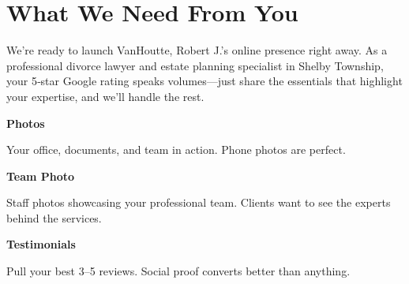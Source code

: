 \documentclass[11pt,letterpaper]{article}
\begin{document}
\vspace{0.2em}

\section*{What We Need From You}

We’re ready to launch VanHoutte, Robert J.’s online presence right away. As a professional divorce lawyer and estate planning specialist in Shelby Township, your 5‑star Google rating speaks volumes—just share the essentials that highlight your expertise, and we’ll handle the rest.

\vspace{0.12em}

\noindent\begin{minipage}[t]{0.48\textwidth}
\begin{tcolorbox}[colframe=accent-teal, boxrule=1pt, left=0.7em, right=0.7em, top=0.5em, bottom=0.5em, arc=4pt, boxsep=0pt]
{\bfseries\small\color{accent-teal}Photos}

\vspace{0.15em}

{\small Your office, documents, and team in action. Phone photos are perfect.}
\end{tcolorbox}

\vspace{0.1em}

\begin{tcolorbox}[colframe=accent-teal, boxrule=1pt, left=0.7em, right=0.7em, top=0.5em, bottom=0.5em, arc=4pt, boxsep=0pt]
{\bfseries\small\color{accent-teal}Team Photo}

\vspace{0.15em}

{\small Staff photos showcasing your professional team. Clients want to see the experts behind the services.}
\end{tcolorbox}

\vspace{0.1em}

\begin{tcolorbox}[colframe=accent-teal, boxrule=1pt, left=0.7em, right=0.7em, top=0.5em, bottom=0.5em, arc=4pt, boxsep=0pt]
{\bfseries\small\color{accent-teal}Testimonials}

\vspace{0.15em}

{\small Pull your best 3--5 reviews. Social proof converts better than anything.}
\end{tcolorbox}
\end{minipage}
\end{document}

